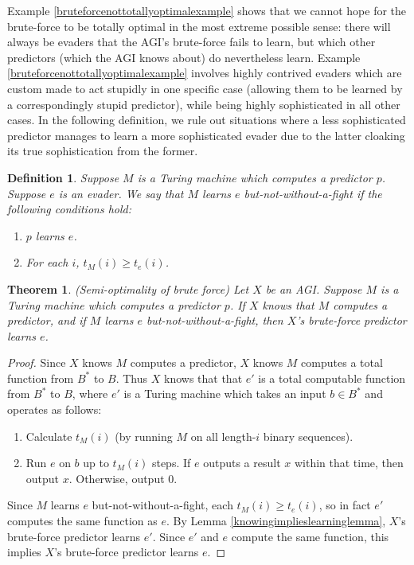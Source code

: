 \documentclass{article}
\newtheorem{definition}{Definition}
\newtheorem{theorem}{Theorem}
\begin{document}
Example \ref{bruteforcenottotallyoptimalexample} shows that we cannot
hope for the brute-force to be totally optimal in the most extreme possible sense:
there will always be evaders that the AGI's brute-force fails to learn, but which other
predictors (which the AGI knows about)
do nevertheless learn. Example \ref{bruteforcenottotallyoptimalexample} involves
highly contrived evaders which are custom made to act stupidly in one specific case
(allowing them to be learned by a correspondingly stupid predictor), while being
highly sophisticated in all other cases. In the following definition, we rule out
situations where a less sophisticated predictor manages to learn a
more sophisticated evader due to the latter cloaking its true sophistication from
the former.

\begin{definition}
    Suppose $M$ is a Turing machine which computes a predictor $p$.
    Suppose $e$ is an evader.
    We say that \emph{$M$ learns $e$ but-not-without-a-fight}
    if the following conditions hold:
    \begin{enumerate}
        \item $p$ learns $e$.
        \item For each $i$, $t_M(i)\geq t_e(i)$.
    \end{enumerate}
\end{definition}

\begin{theorem}
\label{semioptimalitytheorem}
    (Semi-optimality of brute force)
    Let $X$ be an AGI.
    Suppose $M$ is a Turing machine which computes a predictor $p$.
    If $X$ knows that $M$ computes a predictor, and if $M$ learns $e$
    but-not-without-a-fight, then $X$'s brute-force predictor learns $e$.
\end{theorem}

\begin{proof}
    Since $X$ knows $M$ computes a predictor, $X$ knows $M$ computes a total
    function from $B^*$ to $B$. Thus $X$ knows that that $e'$ is a total
    computable function from $B^*$ to $B$, where $e'$ is a Turing machine which
    takes an input $b\in B^*$ and operates as follows:
    \begin{enumerate}
        \item
        Calculate $t_M(i)$ (by running $M$ on all length-$i$ binary sequences).
        \item
        Run $e$ on $b$ up to $t_M(i)$ steps. If $e$ outputs a result $x$ within that
        time, then output $x$. Otherwise, output $0$.
    \end{enumerate}
    Since $M$ learns $e$ but-not-without-a-fight, each $t_M(i)\geq t_e(i)$,
    so in fact $e'$ computes the same function as $e$.
    By Lemma \ref{knowingimplieslearninglemma}, $X$'s brute-force predictor
    learns $e'$. Since $e'$ and $e$ compute the same function, this implies
    $X$'s brute-force predictor learns $e$.
\end{proof}
\end{document}
